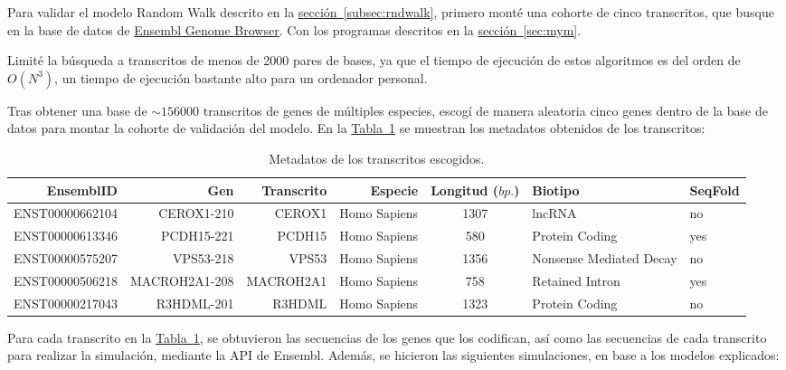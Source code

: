 \documentclass[a4paper,11pt,titlepage]{article}
\newcommand{\nr}[2][sección]{\hyperref[#2]{#1~\ref{#2}}}
\theoremstyle{definition}
\begin{document}
Para validar el modelo Random Walk descrito en la \nr[sección]{subsec:rndwalk}, primero monté una cohorte de cinco transcritos, que busque en la base de datos de \href{https://www.ensembl.org/index.html}{Ensembl Genome Browser}. Con los programas descritos en la \nr[sección]{sec:mym}. 

Limité la búsqueda a transcritos de menos de 2000 pares de bases, ya que el tiempo de ejecución de estos algoritmos es del orden de $O(N^3)$, un tiempo de ejecución bastante alto para un ordenador personal.

Tras obtener una base de $\sim156000$ transcritos de genes de múltiples especies, escogí de manera aleatoria cinco genes dentro de la base de datos para montar la cohorte de validación del modelo. En la \nr[Tabla]{tab:transcripts} se muestran los metadatos obtenidos de los transcritos:

\begin{table}[H]
	\centering
    \begin{adjustbox}{width=\textwidth}
	\begin{tabular}{rrrrcll}
	    \toprule
        EnsemblID & Gen & Transcrito & Especie & Longitud ($bp.$) & Biotipo & SeqFold \\
		\midrule
        ENST00000662104 & CEROX1-210 & CEROX1 & Homo Sapiens & 1307 & lncRNA & no \\
        ENST00000613346 & PCDH15-221 & PCDH15 & Homo Sapiens & 580
        & Protein Coding  & yes \\
        ENST00000575207 & VPS53-218 & VPS53 & Homo Sapiens & 1356
        & Nonsense Mediated Decay & no \\
        ENST00000506218 & MACROH2A1-208 & MACROH2A1 & Homo Sapiens & 758 & Retained Intron & yes \\
        ENST00000217043 & R3HDML-201 & R3HDML & Homo Sapiens & 1323 & Protein Coding & no \\
		\bottomrule
	\end{tabular}
    \end{adjustbox}
	\caption{Metadatos de los transcritos escogidos.}
    \label{tab:transcripts}
\end{table}

Para cada transcrito en la \nr[Tabla]{tab:transcripts}, se obtuvieron las secuencias de los genes que los codifican, así como las secuencias de cada transcrito para realizar la simulación, mediante la API de Ensembl. Además, se hicieron las siguientes simulaciones, en base a los modelos explicados: 
\end{document}
